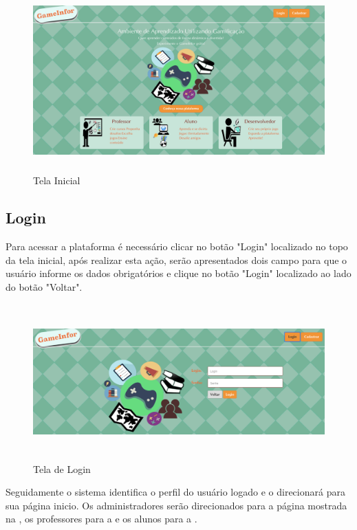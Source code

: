 \begin{figure}[h]
\begin{center}
  \includegraphics[width=15cm, height=7cm]{images/proposta-img/Figura4-8.png}
  \caption{Tela Inicial}
  \label{fig:Figura4-8}
\end{center}
\end{figure}

\subsection{Login}

Para acessar a plataforma é necessário clicar no botão "Login"  localizado no topo da tela inicial, após realizar esta ação, serão apresentados dois campo para que o usuário informe os dados obrigatórios  e clique no botão "Login" localizado ao lado do botão "Voltar".

\begin{figure}[h]
\begin{center}
  \includegraphics[width=15cm, height=6cm]{images/proposta-img/Figura4-9.png}
  \caption{Tela de Login}
  \label{fig:Figura4-9}
\end{center}
\end{figure}

Seguidamente o sistema identifica o perfil do usuário logado e o direcionará para sua página inicio. Os administradores serão direcionados para a página mostrada na , os professores para a  e os alunos para a  .


